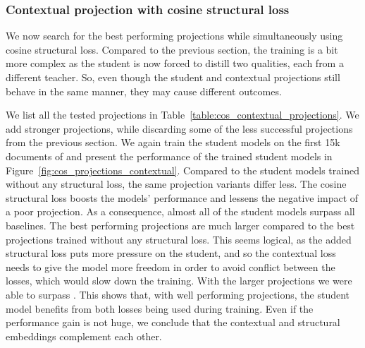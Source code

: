 \subsubsection{Contextual projection with cosine structural
loss}\label{section:projections_cos}

We now search for the best performing projections while simultaneously using
cosine structural loss. Compared to the previous section, the training is a bit
more complex as the student is now forced to distill two qualities, each from a
different teacher. So, even though the student and contextual
projections still behave in the same manner, they may cause different outcomes.

We list all the tested projections in
Table~\ref{table:cos_contextual_projections}. We add stronger projections,
while discarding some of the less successful projections from the previous
section. We again train the student models on the first 15k documents of
 and present the performance of the trained student models in
Figure~\ref{fig:cos_projections_contextual}. Compared to the student models
trained without any structural loss, the same projection variants differ less.
The cosine structural loss boosts the models' performance and lessens the
negative impact of a poor projection. As a consequence, almost all of the
student models surpass all baselines. The best performing projections are much
larger compared to the best projections trained without any structural loss.
This seems logical, as the added structural loss puts more pressure on the
student, and so the contextual loss needs to give the model more freedom in
order to avoid conflict between the losses, which would slow down the training.
With the larger projections we were able to surpass
. This shows that, with well performing
projections, the student model benefits from both losses being used during
training. Even if the performance gain is not huge, we conclude that the
contextual and structural embeddings complement each other.

